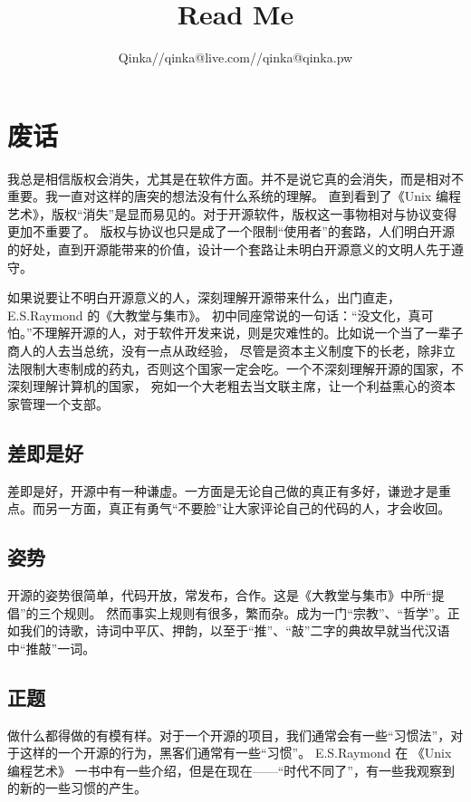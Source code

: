 \documentclass{ctexart}
\author{Qinka//qinka@live.com//qinka@qinka.pw}
\title{Read Me}
\begin{document}
\maketitle

\section{废话}

我总是相信版权会消失，尤其是在软件方面。并不是说它真的会消失，而是相对不重要。我一直对这样的唐突的想法没有什么系统的理解。
直到看到了《Unix 编程艺术》，版权“消失”是显而易见的。对于开源软件，版权这一事物相对与协议变得更加不重要了。
版权与协议也只是成了一个限制“使用者”的套路，人们明白开源的好处，直到开源能带来的价值，设计一个套路让未明白开源意义的文明人先于遵守。

如果说要让不明白开源意义的人，深刻理解开源带来什么，出门直走，E.S.Raymond 的《大教堂与集市》。
初中同座常说的一句话：“没文化，真可怕。”不理解开源的人，对于软件开发来说，则是灾难性的。比如说一个当了一辈子商人的人去当总统，没有一点从政经验，
尽管是资本主义制度下的长老，除非立法限制大枣制成的药丸，否则这个国家一定会吃。一个不深刻理解开源的国家，不深刻理解计算机的国家，
宛如一个大老粗去当文联主席，让一个利益熏心的资本家管理一个支部。

\subsection{差即是好}

差即是好，开源中有一种谦虚。一方面是无论自己做的真正有多好，谦逊才是重点。而另一方面，真正有勇气“不要脸”让大家评论自己的代码的人，才会收回。

\subsection{姿势}

开源的姿势很简单，代码开放，常发布，合作。这是《大教堂与集市》中所“提倡”的三个规则。
然而事实上规则有很多，繁而杂。成为一门“宗教”、“哲学”。正如我们的诗歌，诗词中平仄、押韵，以至于“推”、“敲”二字的典故早就当代汉语中“推敲”一词。


\subsection{正题}
做什么都得做的有模有样。对于一个开源的项目，我们通常会有一些“习惯法”，对于这样的一个开源的行为，黑客们通常有一些“习惯”。
E.S.Raymond 在 《Unix 编程艺术》 一书中有一些介绍，但是在现在——“时代不同了”，有一些我观察到的新的一些习惯的产生。
\end{document}
